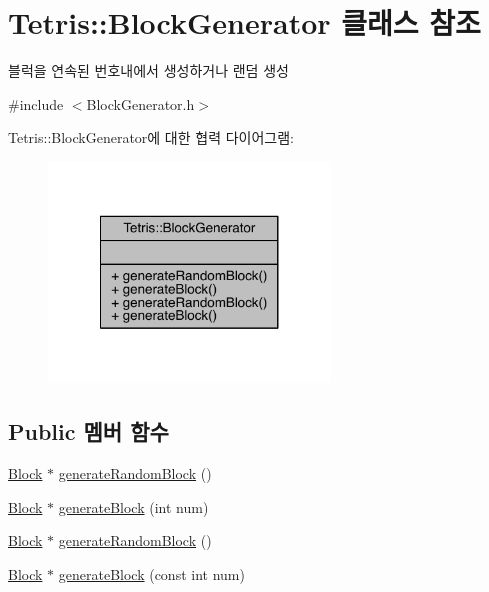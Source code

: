 \hypertarget{class_tetris_1_1_block_generator}{}\section{Tetris\+:\+:Block\+Generator 클래스 참조}
\label{class_tetris_1_1_block_generator}


블럭을 연속된 번호내에서 생성하거나 랜덤 생성  




{\ttfamily \#include $<$Block\+Generator.\+h$>$}



Tetris\+:\+:Block\+Generator에 대한 협력 다이어그램\+:
\nopagebreak
\begin{figure}[H]
\begin{center}
\leavevmode
\includegraphics[width=212pt]{d5/dda/class_tetris_1_1_block_generator__coll__graph}
\end{center}
\end{figure}
\subsection*{Public 멤버 함수}
\begin{DoxyCompactItemize}
\item 
\hyperlink{class_tetris_1_1_block}{Block} $\ast$ \hyperlink{class_tetris_1_1_block_generator_a10dfe1467d40437ad41c5ae76437ad78}{generate\+Random\+Block} ()
\item 
\hyperlink{class_tetris_1_1_block}{Block} $\ast$ \hyperlink{class_tetris_1_1_block_generator_a581b22cebe170d3fe8b51130c01e7a22}{generate\+Block} (int num)
\item 
\hyperlink{class_tetris_1_1_block}{Block} $\ast$ \hyperlink{class_tetris_1_1_block_generator_a434df5baf3944a534492b63763b532a6}{generate\+Random\+Block} ()
\item 
\hyperlink{class_tetris_1_1_block}{Block} $\ast$ \hyperlink{class_tetris_1_1_block_generator_a584fde2bfe1cdd4505bd905befd73d21}{generate\+Block} (const int num)
\end{DoxyCompactItemize}


